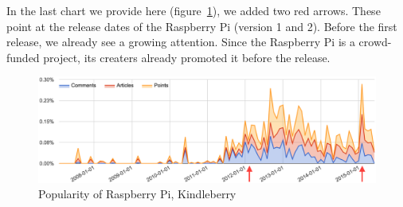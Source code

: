 In the last chart we provide here (figure~\ref{fig:trend_raspberry}), we added two red arrows. These point at the release dates of the Raspberry Pi (version 1 and 2). Before the first release, we already see a growing attention. Since the Raspberry Pi is a crowd-funded project, its creaters already promoted it before the release.
\begin{figure}[H] %
	\caption{Popularity of Raspberry Pi, Kindleberry}
	\label{fig:trend_raspberry}
	\centering
	\includegraphics[width=14cm]{topic_trends/raspberry_relative}
\end{figure}
\pagebreak